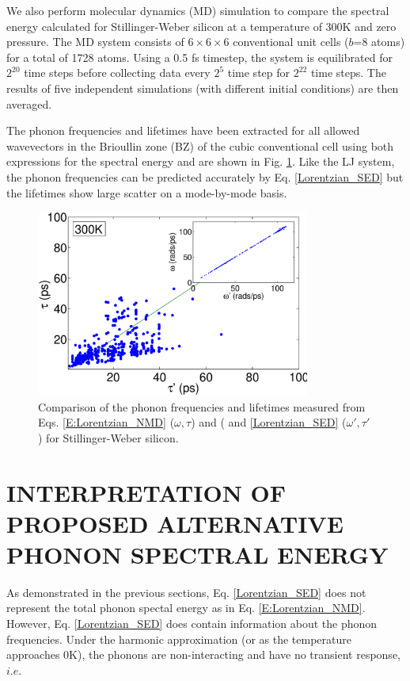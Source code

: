 \documentclass[twocolumn,10pt]{asme2e}
\begin{document}
We also perform molecular dynamics (MD) simulation to compare the spectral energy calculated for Stillinger-Weber silicon \cite{stillinger1985} at a temperature of $300$K and zero pressure. The MD system consists
of $6\times 6\times 6$ conventional unit cells ($b$=8 atoms) for a total of 1728 atoms.
Using a 0.5 fs timestep, the system is equilibrated for $2^{20}$ time steps before collecting data every $2^5$ time step for $2^{22}$ time steps. The results of five independent simulations (with different initial conditions) are then averaged.

The phonon frequencies and lifetimes have been extracted for all allowed wavevectors in the Brioullin zone (BZ) of the cubic conventional cell using both expressions for the spectral energy and are shown in Fig. \ref{F:FREQ_LIFE_Si}. Like the LJ system, the phonon frequencies can be predicted accurately by Eq$.$ \eqref{Lorentzian_SED} but the lifetimes show large scatter on a mode-by-mode basis.

\begin{figure}
\includegraphics[angle=0,width=90.0mm]{Si_NMD_SED.eps}
\caption{\label{F:FREQ_LIFE_Si} Comparison of the phonon frequencies and lifetimes measured from Eqs$.$ \eqref{E:Lorentzian_NMD} ($\omega,\tau$) and   ( and \eqref{Lorentzian_SED} ($\omega',\tau'$) for Stillinger-Weber silicon.}
\vspace*{-5mm}
\end{figure}

\section*{INTERPRETATION OF PROPOSED ALTERNATIVE PHONON SPECTRAL ENERGY}\label{S:CNT_Case_study}

As demonstrated in the previous sections, Eq. \eqref{Lorentzian_SED} does not represent the total phonon spectal energy as in Eq$.$ \eqref{E:Lorentzian_NMD}. However, Eq. \eqref{Lorentzian_SED} does contain information about the phonon frequencies.  Under the harmonic approximation (or as the temperature approaches $0$K), the phonons are non-interacting and have no transient response, $i.e.$
\end{document}

